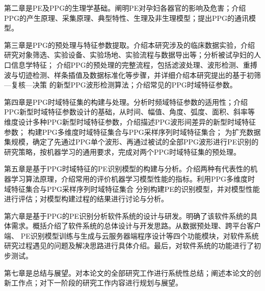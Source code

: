 第二章是PE及PPG的生理学基础。阐明PE对孕妇各器官的影响及危害；介绍PPG的产生原理、采集原理、典型特性、生理及非生理模型；提出PPG的通讯模型。

第三章是PPG的预处理与特征参数提取。介绍本研究涉及的临床数据实验，介绍研究对象筛选、实验设备、实验场地、实验流程与数据导出等；分析被试孕妇的人口信息学特征；
介绍PPG的预处理的完整流程，包括滤波处理、波形检测、重搏波与切迹检测、样条插值及数据标准化等步骤，并详细介绍本研究提出的基于初筛—复核—决策
的新型PPG波形检测算法；介绍常见的PPG时域特征参数。

第四章是PPG时域特征集的构建与处理。分析时频域特征参数的适用性；介绍PPG新型时域特征参数设计的基础，从时间、幅值、角度、弧度、面积、斜率等维度设计多种PPG新型时域特征参数，介绍描述PPG波形间差异的新型时域特征参数；
构建PPG多维度时域特征集合与PPG采样序列时域特征集合；
为扩充数据集规模，确定了先通过PPG单个波形、再通过被试的全部PPG波形进行PE识别的研究策略，按机器学习的通用要求，完成对两个PPG时域特征集的预处理。

第五章是基于PPG时域特征的PE识别模型的构建与分析。介绍两种有代表性的机器学习算法原理，介绍常用的评价机器学习模型性能的指标。利用PPG多维度时域特征集合与PPG采样序列时域特征集合
分别构建PE的识别模型，并对模型性能进行评估；对模型构建过程的结果进行讨论与分析。

第六章是基于PPG的PE识别分析软件系统的设计与研发。明确了该软件系统的具体需求。概括介绍了软件系统的总体设计与开发思路。从数据预处理、跨平台客户端、
PE识别模型训练与生成与云服务器端程序设计等四个功能模块，对软件系统研究过程遇见的问题及解决思路进行具体介绍。最后，对软件系统的功能进行了初步测试。

第七章是总结与展望。对本论文的全部研究工作进行系统性总结；阐述本论文的创新工作点；对下一阶段的研究工作内容进行规划与展望。